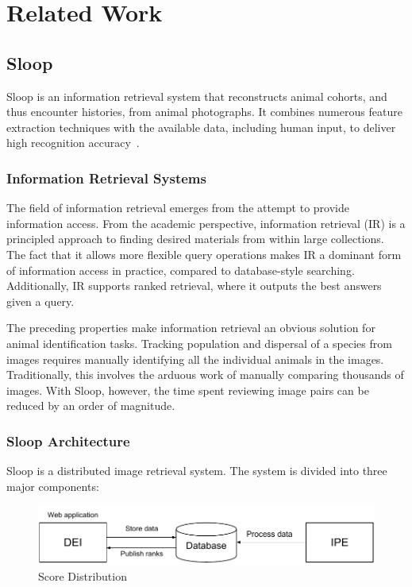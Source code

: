 \graphicspath{{./images/chap2/}}
\chapter{Related Work} %
\label{cha:related_work}

\section{Sloop}

Sloop is an information retrieval system that reconstructs animal cohorts, and thus
encounter histories, from animal photographs. It combines numerous feature
extraction techniques with the available data, including human input, to deliver
high recognition accuracy~\cite{sloop}.

  \subsection{Information Retrieval Systems}

  The field of information retrieval emerges from the attempt to provide
  information access. From the academic perspective, information retrieval (IR)
  is a principled approach to finding desired materials
  from within large collections. The fact that it allows more flexible
  query operations makes IR a dominant form of information access in practice,
  compared to database-style searching. Additionally, IR supports ranked
  retrieval, where it outputs the best answers given a query.

  The preceding properties make information retrieval an obvious solution for
  animal identification tasks. Tracking population and dispersal of a species from
  images requires manually identifying all the individual animals in the images.
  Traditionally, this involves the arduous work of manually comparing thousands
  of images. With Sloop, however, the time spent reviewing image pairs can be
  reduced by an order of magnitude.

  \subsection{Sloop Architecture} Sloop is a distributed image retrieval system.
  The system is divided into three major components:

  \begin{figure}[htb]
    \centering
    \includegraphics[width=\textwidth]{sloop/system}
    \caption{Score Distribution}
    \label{fig:sloop_overview} %
  \end{figure}

